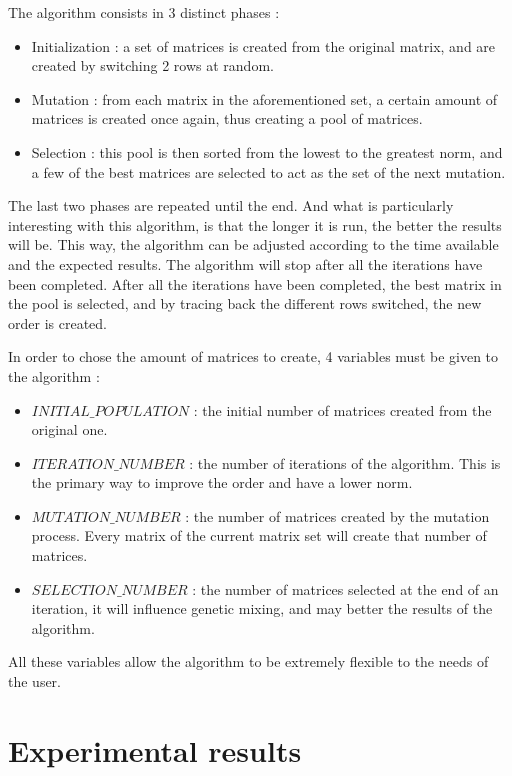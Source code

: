\documentclass[12pt]{report}
\begin{document}
The algorithm consists in 3 distinct phases :

\begin{itemize}
  \item Initialization : a set of matrices is created from the original matrix, and are created by switching 2 rows at random.
  \item Mutation : from each matrix in the aforementioned set, a certain amount of matrices is created once again, thus creating a pool of matrices.
  \item Selection : this pool is then sorted from the lowest to the greatest norm, and a few of the best matrices are selected to act as the set of the next mutation.
\end{itemize}

The last two phases are repeated until the end. And what is particularly interesting with this algorithm, is that the longer it is run, the better the results will be. This way, the algorithm can be adjusted according to the time available and the expected results. The algorithm will stop after all the iterations have been completed.
After all the iterations have been completed, the best matrix in the pool is selected, and by tracing back the different rows switched, the new order is created.

In order to chose the amount of matrices to create, 4 variables must be given to the algorithm :

\begin{itemize}
  \item $INITIAL\_POPULATION$ : the initial number of matrices created from the original one.
  \item $ITERATION\_NUMBER$ : the number of iterations of the algorithm. This is the primary way to improve the order and have a lower norm.
  \item $MUTATION\_NUMBER$ : the number of matrices created by the mutation process. Every matrix of the current matrix set will create that number of matrices.
  \item $SELECTION\_NUMBER$ : the number of matrices selected at the end of an iteration, it will influence genetic mixing, and may better the results of the algorithm.
\end{itemize}

All these variables allow the algorithm to be extremely flexible to the needs of the user. 

\chapter{Experimental results}
\end{document}
